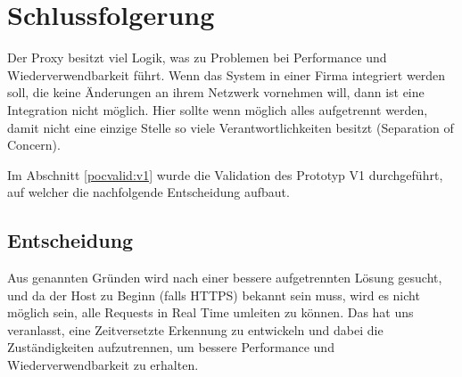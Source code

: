 


\newpage
\section{Schlussfolgerung}
Der Proxy besitzt viel Logik, was zu Problemen bei Performance und Wiederverwendbarkeit führt. Wenn das System in einer Firma integriert werden soll, die keine Änderungen an ihrem Netzwerk vornehmen will, dann ist eine Integration nicht möglich.
Hier sollte wenn möglich alles aufgetrennt werden, damit nicht eine einzige Stelle so viele Verantwortlichkeiten besitzt (Separation of Concern).

Im Abschnitt \ref{pocvalid:v1} wurde die Validation des Prototyp V1 durchgeführt, auf welcher die nachfolgende Entscheidung aufbaut.

\subsection{Entscheidung}
Aus genannten Gründen wird nach einer bessere aufgetrennten Lösung gesucht, und da der Host zu Beginn (falls HTTPS) bekannt sein muss, wird es nicht möglich sein, alle Requests in Real Time umleiten zu können.
Das hat uns veranlasst, eine Zeitversetzte Erkennung zu entwickeln und dabei die Zuständigkeiten aufzutrennen, um bessere Performance und Wiederverwendbarkeit zu erhalten.







